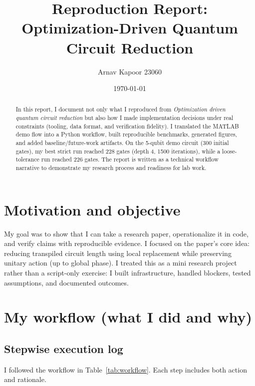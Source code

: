 \documentclass[11pt,a4paper]{article}
\title{Reproduction Report: Optimization-Driven Quantum Circuit Reduction}
\author{Arnav Kapoor 23060}
\date{\today}
\begin{document}
\maketitle

\begin{abstract}
In this report, I document not only what I reproduced from \emph{Optimization driven quantum circuit reduction} but also how I made implementation decisions under real constraints (tooling, data format, and verification fidelity). I translated the MATLAB demo flow into a Python workflow, built reproducible benchmarks, generated figures, and added baseline/future-work artifacts. On the 5-qubit demo circuit (300 initial gates), my best strict run reached 228 gates (depth 4, 1500 iterations), while a loose-tolerance run reached 226 gates. The report is written as a technical workflow narrative to demonstrate my research process and readiness for lab work.
\end{abstract}

\section{Motivation and objective}
My goal was to show that I can take a research paper, operationalize it in code, and verify claims with reproducible evidence. I focused on the paper's core idea: reducing transpiled circuit length using local replacement while preserving unitary action (up to global phase). I treated this as a mini research project rather than a script-only exercise: I built infrastructure, handled blockers, tested assumptions, and documented outcomes.

\section{My workflow (what I did and why)}
\subsection{Stepwise execution log}
I followed the workflow in Table~\ref{tab:workflow}. Each step includes both action and rationale.
\end{document}
